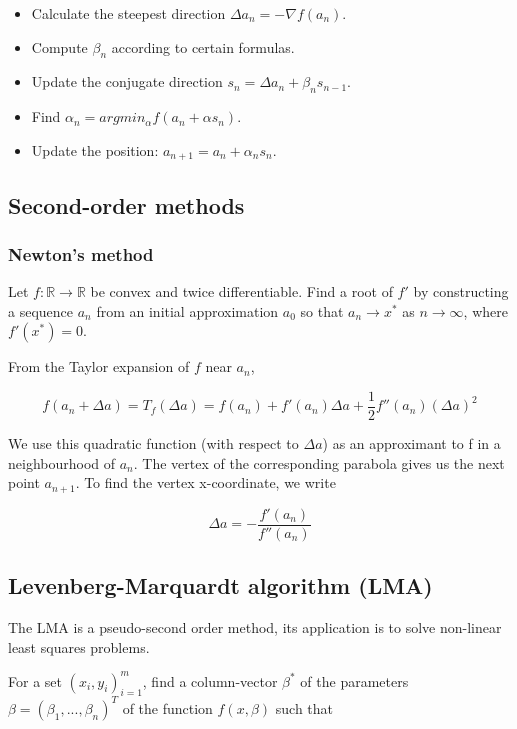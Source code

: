 \begin{itemize}
    \item Calculate the steepest direction $\Delta a_n = - \nabla f(a_n)$.
    \item Compute $\beta_n$ according to certain formulas.
    \item Update the conjugate direction $s_n = \Delta a_n + \beta_n s_{n - 1}$.
    \item Find $\alpha_n = arg min_{\alpha} f(a_n + \alpha s_n)$.
    \item Update the position: $a_{n + 1} = a_n + \alpha_n s_n$.
\end{itemize}

\subsection*{Second-order methods}
\subsubsection*{Newton's method}
Let $f: \mathbb{R} \rightarrow \mathbb{R}$ be convex and twice differentiable. Find a root of $f'$ by
constructing a sequence $a_n$ from an initial approximation $a_0$ so that $a_n \rightarrow x^{*}$ as $n \rightarrow \infty$, where $f'(x^{*}) = 0$.

From the Taylor expansion of $f$ near $a_n$,

\begin{equation*}
    f(a_n + \Delta a) = T_f(\Delta a)= f(a_n) + f'(a_n)\Delta a + \frac{1}{2}f''(a_n)(\Delta a)^2
\end{equation*}

We use this quadratic function (with respect to $\Delta a$) as an approximant to f in a neighbourhood of $a_n$.
The vertex of the corresponding parabola gives us the next point $a_{n + 1}$. To find the vertex x-coordinate, we write

\begin{equation*}
    \Delta a = - \frac{f'(a_n)}{f''(a_n)}
\end{equation*}

\subsection*{Levenberg-Marquardt algorithm (LMA)}

The LMA is a pseudo-second order method, its application is to solve non-linear least squares problems.

For a set $(x_i, y_i)^{m}_{i=1}$, find a column-vector $\beta^{*}$ of the parameters $\beta = (\beta_1, ..., \beta_n)^T$ of the function $f(x, \beta)$ such that

